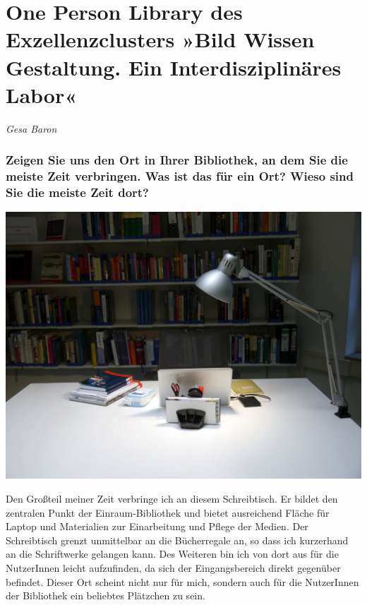 
\vspace*{.5cm}
\section{One Person Library des Exzellenzclusters »Bild Wissen Gestaltung. Ein Interdisziplinäres Labor«}
\begin{center}
\emph{Gesa Baron}
\end{center}
\vspace*{1cm}


\hypertarget{zeigen-sie-uns-den-ort-in-ihrer-bibliothek-an-dem-sie-die-meiste-zeit-verbringen.-was-ist-das-fuxfcr-ein-ort-wieso-sind-sie-die-meiste-zeit-dort}{%
\subsubsection{Zeigen Sie uns den Ort in Ihrer Bibliothek, an dem Sie die
meiste Zeit verbringen. Was ist das für ein Ort? Wieso sind Sie die
meiste Zeit
dort?}\label{zeigen-sie-uns-den-ort-in-ihrer-bibliothek-an-dem-sie-die-meiste-zeit-verbringen.-was-ist-das-fuxfcr-ein-ort-wieso-sind-sie-die-meiste-zeit-dort}}

\begin{center}
\includegraphics{bwg-cluster/img/Schreibtischplatz.jpg}
\end{center}

Den Großteil meiner Zeit verbringe ich an diesem Schreibtisch. Er bildet
den zentralen Punkt der Einraum-Bibliothek und bietet ausreichend Fläche
für Laptop und Materialien zur Einarbeitung und Pflege der Medien. Der
Schreibtisch grenzt unmittelbar an die Bücherregale an, so dass ich
kurzerhand an die Schriftwerke gelangen kann. Des Weiteren bin ich von
dort aus für die NutzerInnen leicht aufzufinden, da sich der
Eingangsbereich direkt gegenüber befindet. Dieser Ort scheint nicht nur
für mich, sondern auch für die NutzerInnen der Bibliothek ein beliebtes
Plätzchen zu sein.

